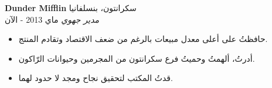 \foreignlanguage{english}{\textbf{Dunder Mifflin}} \hfill سكرانتون، بنسلفانيا\\
\textit{مدير جهوي} \hfill ماي 2013 - الآن\\
\vspace*{-4pt}
\begin{itemize} \itemsep 1pt
	\item حافظتُ على أعلى معدل مبيعات بالرغم من ضعف الاقتصاد وتقادم المنتج.
	\item أدرتُ، ألهمتُ وحميتُ فرع سكرانتون من المجرمين وحيوانات الرّاكون.
	\item قدتُ المكتب لتحقيق نجاح ومجد لا حدود لهما.
\end{itemize}
